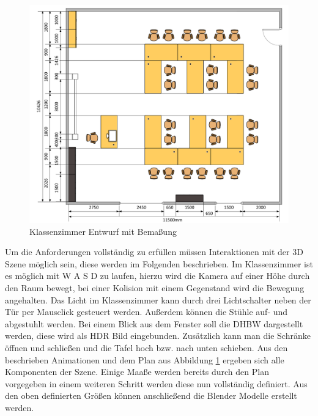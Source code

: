 \begin{figure}[H]
  \centering
  \includegraphics[width=1\textwidth]{images/roomModelVisio.pdf}
  \caption{Klassenzimmer Entwurf mit Bemaßung}
  \label{fig:KlassenzimmerEntwurf}
\end{figure}\noindent
Um die Anforderungen vollständig zu erfüllen müssen Interaktionen mit der 3D Szene möglich sein, diese werden im Folgenden beschrieben.
\newparagraph
Im Klassenzimmer ist es möglich mit W A S D zu laufen, hierzu wird die Kamera auf einer Höhe durch den Raum bewegt, bei einer Kolision mit einem Gegenstand wird die Bewegung angehalten.
Das Licht im Klassenzimmer kann durch drei Lichtschalter neben der Tür per Mausclick gesteuert werden. Außerdem können die Stühle auf- und abgestuhlt werden. Bei einem Blick aus dem Fenster
soll die DHBW dargestellt werden, diese wird als \ac{HDR} Bild eingebunden. Zusätzlich kann man die Schränke öffnen und schließen und die Tafel hoch bzw. nach unten schieben.
\newparagraph
Aus den beschrieben Animationen und dem Plan aus Abbildung \ref{fig:KlassenzimmerEntwurf} ergeben sich alle Komponenten der Szene. Einige Maaße werden bereits durch
den Plan vorgegeben in einem weiteren Schritt werden diese nun vollständig definiert.
\newparagraph
Aus den oben definierten Größen können anschließend die Blender Modelle erstellt werden.
